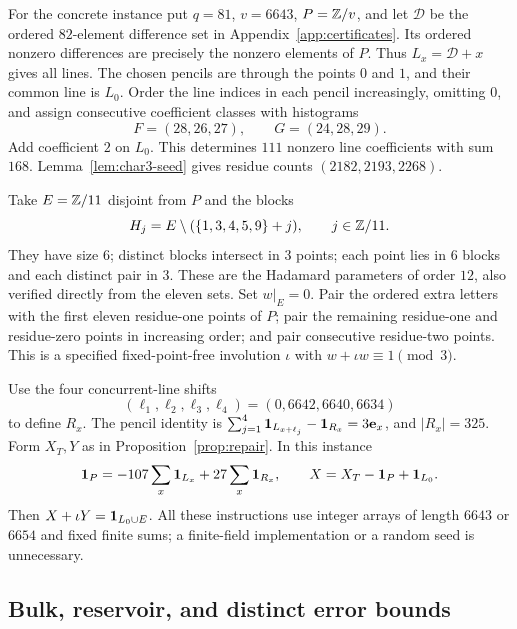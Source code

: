 For the concrete instance put $q=81$, $v=6643$, $P=\mathbb Z/v$, and let $\mathcal D$ be the ordered $82$-element difference set in Appendix~\ref{app:certificates}. Its ordered nonzero differences are precisely the nonzero elements of $P$. Thus $L_x=\mathcal D+x$ gives all lines. The chosen pencils are through the points $0$ and $1$, and their common line is $L_0$. Order the line indices in each pencil increasingly, omitting $0$, and assign consecutive coefficient classes with histograms
\[
 F=(28,26,27),\qquad G=(24,28,29).
\]
Add coefficient $2$ on $L_0$. This determines $111$ nonzero line coefficients with sum $168$. Lemma~\ref{lem:char3-seed} gives residue counts $(2182,2193,2268)$.

Take $E=\mathbb Z/11$ disjoint from $P$ and the blocks
\[
 H_j=E\setminus(\{1,3,4,5,9\}+j),\qquad j\in\mathbb Z/11.
\]
They have size $6$; distinct blocks intersect in $3$ points; each point lies in $6$ blocks and each distinct pair in $3$. These are the Hadamard parameters of order $12$, also verified directly from the eleven sets. Set $w|_E=0$. Pair the ordered extra letters with the first eleven residue-one points of $P$; pair the remaining residue-one and residue-zero points in increasing order; and pair consecutive residue-two points. This is a specified fixed-point-free involution $\iota$ with $w+\iota w\equiv1\pmod3$.

Use the four concurrent-line shifts
\[
 (\ell_1,\ell_2,\ell_3,\ell_4)=(0,6642,6640,6634)
\]
to define $R_x$. The pencil identity is $\sum_{j=1}^4\mathbf1_{L_{x+\ell_j}}-\mathbf1_{R_x}=3\mathbf e_x$, and $|R_x|=325$. Form $X_T,Y$ as in Proposition~\ref{prop:repair}. In this instance
\begin{equation}\label{eq:char3-compact}
 \mathbf1_P=-107\sum_x\mathbf1_{L_x}+27\sum_x\mathbf1_{R_x},
 \qquad X=X_T-\mathbf1_P+\mathbf1_{L_0}.
\end{equation}
Then $X+\iota Y=\mathbf1_{L_0\cup E}$. All these instructions use integer arrays of length $6643$ or $6654$ and fixed finite sums; a finite-field implementation or a random seed is unnecessary.

\subsection{Bulk, reservoir, and distinct error bounds}

